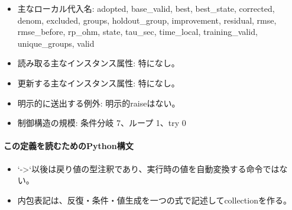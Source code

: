 \documentclass[a4paper,11pt]{article}
\begin{document}
\begin{itemize}[leftmargin=1.6em]
              \item 主なローカル代入名: adopted, base\_valid, best, best\_state, corrected, denom, excluded, groups, holdout\_group, improvement, residual, rmse, rmse\_before, rp\_ohm, state, tau\_sec, time\_local, training\_valid, unique\_groups, valid
              \item 読み取る主なインスタンス属性: 特になし。
              \item 更新する主なインスタンス属性: 特になし。
              \item 明示的に送出する例外: 明示的raiseはない。
              \item 制御構造の規模: 条件分岐 7、ループ 1、try 0
            \end{itemize}
            \paragraph{この定義を読むためのPython構文}
            \begin{itemize}[leftmargin=1.6em]
            \item `->`以後は戻り値の型注釈であり、実行時の値を自動変換する命令ではない。
\item 内包表記は、反復・条件・値生成を一つの式で記述してcollectionを作る。
            \end{itemize}
\end{document}
